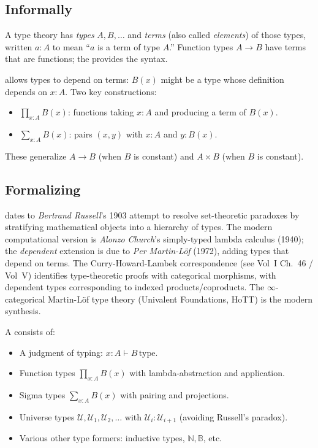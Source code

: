 \subsection{Informally}

A type theory has \emph{types} $A, B, \ldots$ and \emph{terms} (also
called \emph{elements}) of those types, written $a : A$ to mean ``$a$
is a term of type $A$.'' Function types $A \to B$ have terms that are
functions; the  provides the syntax.

 allows types to depend on terms: $B(x)$
might be a type whose definition depends on $x : A$. Two key constructions:
\begin{itemize}
  \item {} $\prod_{x : A} B(x)$: functions
        taking $x : A$ and producing a term of $B(x)$.
  \item {} $\sum_{x : A} B(x)$: pairs $(x, y)$
        with $x : A$ and $y : B(x)$.
\end{itemize}
These generalize $A \to B$ (when $B$ is constant) and $A \times B$
(when $B$ is constant).

\subsection{Formalizing}

\begin{nameorigin}
 dates to \emph{Bertrand Russell}'s 1903 attempt to
resolve set-theoretic paradoxes by stratifying mathematical objects
into a hierarchy of types. The modern computational version is
\emph{Alonzo Church}'s simply-typed lambda calculus (1940); the
\emph{dependent} extension is due to \emph{Per Martin-Löf} (1972),
adding types that depend on terms. The Curry-Howard-Lambek correspondence
(see Vol~I Ch.~46 / Vol~V) identifies type-theoretic proofs with
categorical morphisms, with dependent types corresponding to indexed
products/coproducts. The $\infty$-categorical Martin-Löf type theory
(Univalent Foundations, HoTT) is the modern synthesis.
\end{nameorigin}

\begin{definition}
\label{def:dtt}
A  consists of:
\begin{itemize}
  \item A judgment of typing: $x : A \vdash B \, \mathrm{type}$.
  \item Function types $\prod_{x : A} B(x)$ with lambda-abstraction
        and application.
  \item Sigma types $\sum_{x : A} B(x)$ with pairing and projections.
  \item Universe types $\mathcal{U}, \mathcal{U}_1, \mathcal{U}_2, \ldots$
        with $\mathcal{U}_i : \mathcal{U}_{i+1}$ (avoiding Russell's
        paradox).
  \item Various other type formers: inductive types, $\mathbb{N}, \mathbb{B}$,
        etc.
\end{itemize}
\end{definition}

